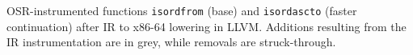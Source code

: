 \label{fig:isordx86-64} OSR-instrumented functions {\tt isordfrom} (base) and {\tt isordascto} (faster continuation) after IR to x86-64 lowering in LLVM. Additions resulting from the IR instrumentation are in grey, while removals are struck-through.